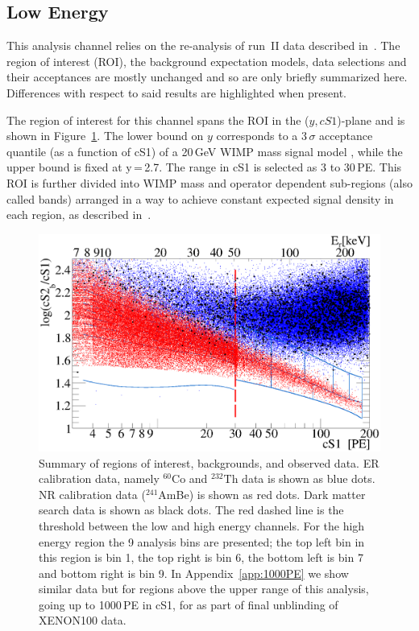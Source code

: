
\subsection{Low Energy}
\label{subsec:LowE}
This analysis channel relies on the re-analysis of run~II data described in~\cite{xe100_run_combination}. The region of interest (ROI), the background 
expectation models, data selections and their acceptances are mostly unchanged and so are only briefly summarized here. Differences with respect to said results are highlighted when present.

The region of interest for this channel spans the ROI in the ($y,cS1$)-plane and is shown in Figure~\ref{fig:phasespace}.  The lower 
bound on $y$ corresponds to a 3\,$\sigma$ acceptance quantile (as a function of cS1) of a 20\,GeV WIMP mass signal model , while the upper bound is fixed at y\,=\,2.7.
The range in cS1 is selected as 3 to 30\,PE. This ROI is further divided into WIMP mass and operator dependent sub-regions (also called bands) arranged in a way to achieve constant expected signal density in each region, as described in~\cite{xe100_run_combination}.

\begin{figure}[]
\begin{minipage}{1\linewidth}
\centerline{\includegraphics[width=1\linewidth]{Figures/eft_sr.eps}}
\end{minipage}
\caption{Summary of regions of interest, backgrounds, and observed data. ER calibration data, namely $^{60}\mathrm{Co}$ and $^{232}\mathrm{Th}$ data is shown as blue dots. NR calibration data ($^{241}$AmBe) is shown as red dots. Dark matter search data is shown as black dots. The red dashed line is the threshold between the low and high energy channels. For the high energy region the 9 analysis bins are presented; the top left bin in this region is bin 1, the top right is bin 6, the bottom left is bin 7 and bottom right is bin 9. In Appendix~\ref{app:1000PE} we show similar data but for regions above the upper range of this analysis, going up to 1000\,PE in cS1, for  as part of final unblinding of XENON100 data. 
}
\label{fig:phasespace}
\end{figure}  


